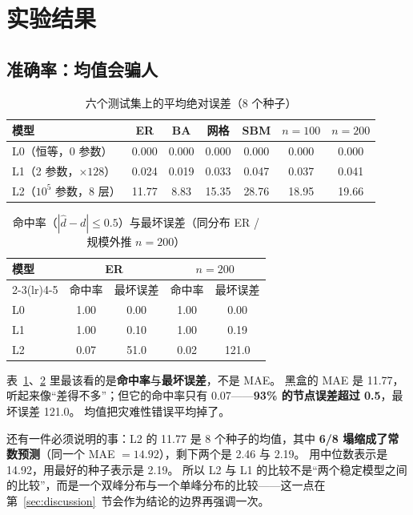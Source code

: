 \section{实验结果}\label{sec:results}

\subsection{准确率：均值会骗人}\label{sec:acc}

\begin{table}[H]
\centering
\caption{六个测试集上的平均绝对误差（8 个种子）}
\label{tab:acc}
\small
\setlength{\tabcolsep}{4pt}
\begin{tabular}{lcccccc}
\toprule
模型 & ER & BA & 网格 & SBM & $n{=}100$ & $n{=}200$ \\
\midrule
L0（恒等，0 参数） & 0.000 & 0.000 & 0.000 & 0.000 & 0.000 & 0.000 \\
L1（2 参数，$\times128$） & 0.024 & 0.019 & 0.033 & 0.047 & 0.037 & 0.041 \\
L2（$10^5$ 参数，8 层） & 11.77 & 8.83 & 15.35 & 28.76 & 18.95 & 19.66 \\
\bottomrule
\end{tabular}
\end{table}

\begin{table}[H]
\centering
\caption{命中率（$|\hat d-d|\le0.5$）与最坏误差（同分布 ER / 规模外推 $n{=}200$）}
\label{tab:hit}
\small
\setlength{\tabcolsep}{5pt}
\begin{tabular}{lcccc}
\toprule
\multirow{2}{*}{模型} & \multicolumn{2}{c}{ER} & \multicolumn{2}{c}{$n{=}200$} \\
\cmidrule(lr){2-3}\cmidrule(lr){4-5}
 & 命中率 & 最坏误差 & 命中率 & 最坏误差 \\
\midrule
L0 & 1.00 & 0.00 & 1.00 & 0.00 \\
L1 & 1.00 & 0.10 & 1.00 & 0.19 \\
L2 & 0.07 & 51.0 & 0.02 & 121.0 \\
\bottomrule
\end{tabular}
\end{table}

表~\ref{tab:acc}、\ref{tab:hit} 里最该看的是\textbf{命中率}与\textbf{最坏误差}，不是 MAE。
黑盒的 MAE 是 11.77，听起来像“差得不多”；但它的命中率只有 0.07——\textbf{93\% 的节点误差超过 0.5}，最坏误差 121.0。
均值把灾难性错误平均掉了。

还有一件必须说明的事：L2 的 11.77 是 8 个种子的均值，其中 \textbf{6/8 塌缩成了常数预测}（同一个 MAE $=14.92$），剩下两个是 2.46 与 2.19。
用中位数表示是 14.92，用最好的种子表示是 2.19。
所以 L2 与 L1 的比较不是“两个稳定模型之间的比较”，而是一个双峰分布与一个单峰分布的比较——这一点在第~\ref{sec:discussion}~节会作为结论的边界再强调一次。

